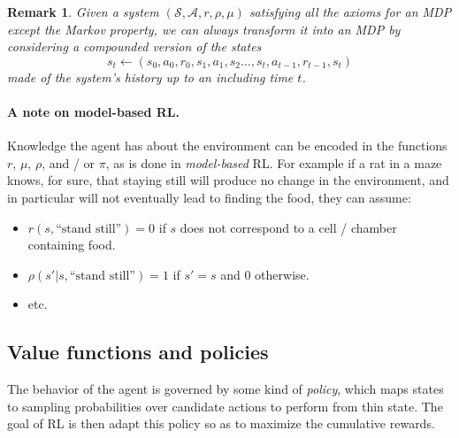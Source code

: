 \documentclass{article} %
\newtheorem{remark}{Remark}
\begin{document}
\begin{remark}
  Given a system $(\mathcal S, \mathcal A, r, \rho, \mu)$ satisfying all the axioms for an MDP
  except the Markov property, we can always transform it into an MDP by considering a compounded
  version of the states
  $$s_t \leftarrow (s_0,a_0,r_0,s_1,a_1,s_2\ldots,s_t,a_{t-1},r_{t-1},s_{t})$$ made of the system's
  history up to an including time $t$.
\end{remark}

\paragraph{A note on model-based RL.}
Knowledge the agent has about the environment can be encoded in the
functions $r$, $\mu$, $\rho$, and / or $\pi$, as is done in
\textit{model-based} RL. For example if a rat in a maze knows, for sure,
that staying still will produce no change in the environment, and in particular will not eventually lead to finding the food, they can assume:
\begin{itemize}
\item $r(s, \text{``stand still''}) = 0$ if $s$ does not correspond to a cell / chamber containing food.
\item $\rho(s'|s,\text{``stand still''}) = 1$ if $s'=s$ and $0$ otherwise.
\item etc.
\end{itemize}

\subsection{Value functions and policies}
The behavior of the agent is governed by some kind of \textit{policy}, which maps states to
sampling probabilities over candidate actions to perform from thin state. The  goal of RL is then
adapt this policy so as to  maximize the cumulative rewards.
\end{document}

